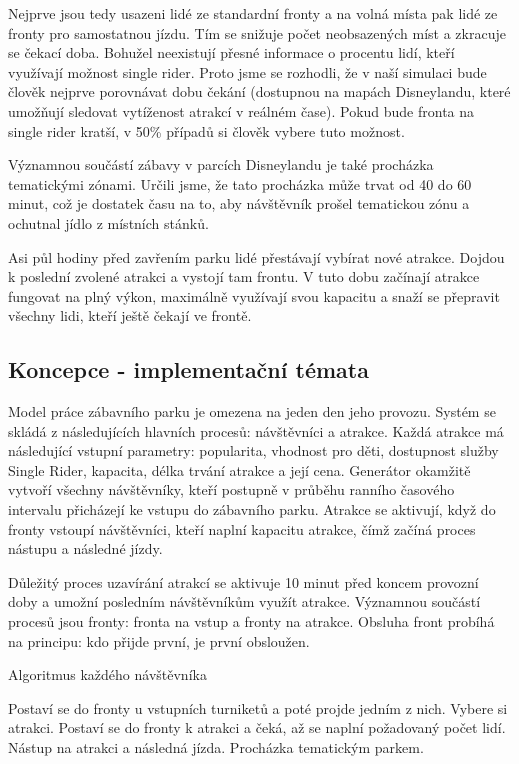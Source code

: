 \documentclass[a4paper,12pt]{article}
\begin{document}
Nejprve jsou tedy usazeni lidé ze standardní fronty a na volná místa pak lidé ze fronty pro samostatnou jízdu. Tím se snižuje počet neobsazených míst a zkracuje se čekací doba.
Bohužel neexistují přesné informace o procentu lidí, kteří využívají možnost single rider. Proto jsme se rozhodli, že v naší simulaci bude člověk nejprve porovnávat dobu čekání (dostupnou na mapách Disneylandu, které umožňují sledovat vytíženost atrakcí v reálném čase). Pokud bude fronta na single rider kratší, v 50\% případů si člověk vybere tuto možnost.


Významnou součástí zábavy v parcích Disneylandu je také procházka tematickými zónami. Určili jsme, že tato procházka může trvat od 40 do 60 minut, což je dostatek času na to, aby návštěvník prošel tematickou zónu a ochutnal jídlo z místních stánků.

Asi půl hodiny před zavřením parku lidé přestávají vybírat nové atrakce. Dojdou k poslední zvolené atrakci a vystojí tam frontu. V tuto dobu začínají atrakce fungovat na plný výkon, maximálně využívají svou kapacitu a snaží se přepravit všechny lidi, kteří ještě čekají ve frontě.



\subsection{Koncepce - implementační témata}
Model práce zábavního parku je omezena na jeden den jeho provozu.
Systém se skládá z následujících hlavních procesů: návštěvníci a atrakce. Každá atrakce má následující vstupní parametry: popularita, vhodnost pro děti, dostupnost služby Single Rider, kapacita, délka trvání atrakce a její cena. Generátor okamžitě vytvoří všechny návštěvníky, kteří postupně v průběhu ranního časového intervalu přicházejí ke vstupu do zábavního parku. Atrakce se aktivují, když do fronty vstoupí návštěvníci, kteří naplní kapacitu atrakce, čímž začíná proces nástupu a následné jízdy.

Důležitý proces uzavírání atrakcí se aktivuje 10 minut před koncem provozní doby a umožní posledním návštěvníkům využít atrakce. Významnou součástí procesů jsou fronty: fronta na vstup a fronty na atrakce. Obsluha front probíhá na principu: kdo přijde první, je první obsloužen.

\begin{algorithm}[H]
\caption{Algoritmus každého návštěvníka}
\begin{algorithmic}[1]
    \State Postaví se do fronty u vstupních turniketů a poté projde jedním z nich.
        \State Vybere si atrakci.
        \State Postaví se do fronty k atrakci a čeká, až se naplní požadovaný počet lidí.
        \State Nástup na atrakci a následná jízda.
            \State Procházka tematickým parkem.
        \EndIf
    \EndWhile
\end{algorithmic}
\end{algorithm}
\end{document}
